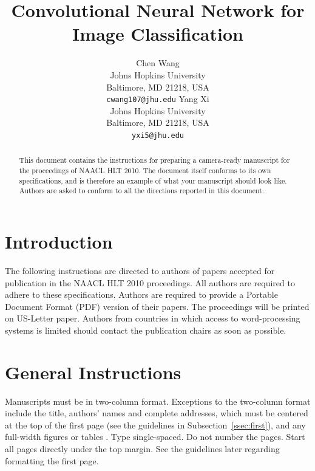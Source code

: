 \documentclass[11pt,letterpaper]{article}
\title{Convolutional Neural Network for Image Classification}
\author{Chen Wang\\
  Johns Hopkins University\\
  Baltimore, MD 21218, USA\\
  {\tt cwang107@jhu.edu}
  \And
  Yang Xi \\
  Johns Hopkins University\\
  Baltimore, MD 21218, USA\\
  {\tt yxi5@jhu.edu}}
\date{}
\begin{document}
\maketitle
\begin{abstract}
  This document contains the instructions for preparing a camera-ready
  manuscript for the proceedings of NAACL HLT 2010. The document itself conforms
  to its own specifications, and is therefore an example of what
  your manuscript should look like.  Authors are asked to conform to
  all the directions reported in this document.
\end{abstract}

\section{Introduction}

The following instructions are directed to authors of papers accepted
for publication in the NAACL HLT 2010 proceedings.  All authors are required
to adhere to these specifications. Authors are required to provide 
a Portable Document Format (PDF) version of
their papers.  The proceedings will be printed on US-Letter paper.
Authors from countries in which access to word-processing systems is
limited should contact the publication chairs as soon as possible.


\section{General Instructions}

Manuscripts must be in two-column format.  Exceptions to the
two-column format include the title, authors' names and complete
addresses, which must be centered at the top of the first page (see
the guidelines in Subsection~\ref{ssec:first}), and any full-width
figures or tables .  Type single-spaced.  Do not number the pages.
Start all pages directly under the top margin.  See the guidelines
later regarding formatting the first page.


\end{document}

